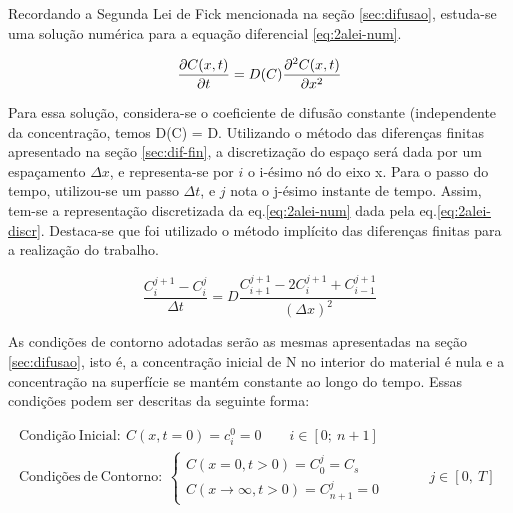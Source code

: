 Recordando a Segunda Lei de Fick mencionada na seção \ref{sec:difusao}, estuda-se uma solução numérica para a equação diferencial \ref{eq:2alei-num}.

\begin{equation}
\label{eq:2alei-num}
\pdv{C(x,t)}{t} = D(C)\pdv[2]{C(x,t)}{x}
\end{equation}

Para essa solução, considera-se o coeficiente de difusão constante (independente da concentração, temos D(C) = D. Utilizando o método das diferenças finitas apresentado na seção \ref{sec:dif-fin}, a discretização do espaço será dada por um espaçamento {$\Delta x$}, e representa-se por $i$ o i-ésimo nó do eixo x. Para o passo do tempo, utilizou-se um passo {$\Delta t$}, e $j$ nota o j-ésimo instante de tempo. Assim, tem-se a representação discretizada da eq.\ref{eq:2alei-num} dada pela eq.\ref{eq:2alei-discr}. Destaca-se que foi utilizado o método implícito das diferenças finitas para a realização do trabalho.

\begin{equation}
\label{eq:2alei-discr}
\dfrac{C_i^{j+1} - C_i^j}{\Delta t} = D\dfrac{C_{i+1}^{j+1} - 2C_i^{j+1} + C_{i-1}^{j+1}}{(\Delta x)^2}
\end{equation}



As condições de contorno adotadas serão as mesmas apresentadas na seção \ref{sec:difusao}, isto é, a concentração inicial de N no interior do material é nula e a concentração na superfície se mantém constante ao longo do tempo. Essas condições podem ser descritas da seguinte forma:

\begin{gather*}
		\mathrm{Condição\ Inicial: }\ C(x, t=0) = c_i^0 = 0 \qquad i \in [0;\ n+1] \\
		\mathrm{Condições\ de\ Contorno:}\ 
		\left\{
    		\begin{array}{l}
      			C(x=0, t>0) = C_0^j = C_s  \\
				C(x\rightarrow\infty, t>0) = C_{n+1}^j = 0 
			\end{array}
    		\begin{array}{l}
      		\qquad \\
			\qquad \\	   
    		\end{array}
    		\begin{array}{l}
    			j \in [0,\ T] 
    		\end{array}
		\right.	
\end{gather*}



